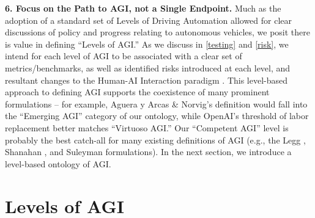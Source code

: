 \documentclass{article}
\theoremstyle{plain}
\theoremstyle{definition}
\theoremstyle{remark}
\begin{document}
\textbf{6. Focus on the Path to AGI, not a Single Endpoint.} Much as the adoption of a standard set of Levels of Driving Automation \citep{drivingLevels} allowed for clear discussions of policy and progress relating to autonomous vehicles, we posit there is value in defining “Levels of AGI.”  As we discuss in \cref{testing} and \cref{risk}, we intend for each level of AGI to be associated with a clear set of metrics/benchmarks, as well as identified risks introduced at each level, and resultant changes to the Human-AI Interaction paradigm \citep{morris2023design}. This level-based approach to defining AGI supports the coexistence of many prominent formulations – for example, Aguera y Arcas \& Norvig’s definition \citep{blaiseAGI} would fall into the “Emerging AGI” category of our ontology, while OpenAI’s threshold of labor replacement \citep{openAICharter} better matches “Virtuoso AGI.” Our “Competent AGI” level is probably the best catch-all for many existing definitions of AGI (e.g., the Legg \citep{leggThesis}, Shanahan \citep{murrayBook}, and Suleyman \citep{comingWave} formulations). In the next section, we introduce a level-based ontology of AGI.    

\section{Levels of AGI}
\label{levels}
\end{document}
